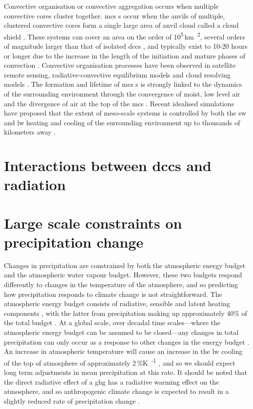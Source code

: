 Convective organisation or convective aggregation occurs when multiple convective cores cluster together. \acrshort{mcs} s occur when the anvils of multiple, clustered convective cores form a single large area of anvil cloud called a cloud shield \citep{roca_simple_2017}. 
These systems can cover an area on the order of 10\textsuperscript{5}\,\unit{km\textsuperscript{2}}, several orders of magnitude larger than that of isolated \acrshort{dcc}s \citep{houze_mesoscale_2004}, and typically exist to 10-20 hours or longer \citep{chen_diurnal_1997} due to the increase in the length of the initiation and mature phases of convection \citep{wall_life_2018}.
Convective organisation processes have been observed in satellite remote sensing, radiative-convective equilibrium models and cloud resolving models \citep{holloway_observing_2017}. 
The formation and lifetime of \acrshort{mcs} s is strongly linked to the dynamics of the surrounding environment through the convergence of moist, low level air and the divergence of air at the top of the \acrshort{mcs}  \citep{houze_chapter_2014}. 
Recent idealised simulations have proposed that the extent of meso-scale systems is controlled by both the \acrshort{sw}  and \acrshort{lw}  heating and cooling of the surrounding environment up to thousands of kilometers away \citep{beucler_budget_2019}. 



\section{Interactions between \acrshort{dcc}s and radiation}



\section{Large scale constraints on precipitation change}


Changes in precipitation are constrained by both the atmospheric energy budget and the atmospheric water vapour budget.
However, these two budgets respond differently to changes in the temperature of the atmosphere, and so predicting how precipitation responds to climate change is not straightforward.
The atmospheric energy budget consists of radiative, sensible and latent heating components \citep{trenberth_earths_2009}, with the latter from precipitation making up approximately 40\% of the total budget \citep{rosenfeld_flood_2008}.
At a global scale, over decadal time scales---where the atmospheric energy budget can be assumed to be closed---any changes in total precipitation can only occur as a response to other changes in the energy budget \citep{allen_constraints_2002}.
An increase in atmospheric temperature will cause an increase in the \acrshort{lw}  cooling of the top of atmosphere of approximately 2\,\%\unit{K\textsuperscript{-1}} \citep{held_robust_2006}, and so we should expect long term adjustments in mean precipitation at this rate.
It should be noted that the direct radiative effect of a \acrshort{ghg}  has a radiative warming effect on the atmosphere, and so anthropogenic climate change is expected to result in a slightly reduced rate of precipitation change \citep{allen_constraints_2002}.

